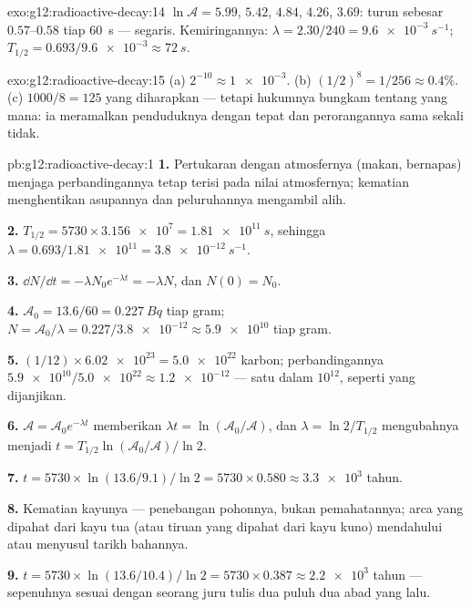\begin{solution}{exo:g12:radioactive-decay:14}
$\ln \mathcal A = 5.99$, $5.42$, $4.84$, $4.26$, $3.69$: turun sebesar
$0.57$--$0.58$ tiap \qty{60}{s} --- segaris. Kemiringannya:
$\lambda = 2.30/240 = \qty{9.6e-3}{s^{-1}}$;
$T_{1/2} = 0.693/\num{9.6e-3} \approx \qty{72}{s}$.
\end{solution}

\begin{solution}{exo:g12:radioactive-decay:15}
(a) $2^{-10} \approx \num{1e-3}$. (b) $(1/2)^8 = 1/256 \approx
0.4\%$. (c) $1000/8 = 125$ yang diharapkan --- tetapi hukumnya bungkam tentang
yang mana: ia meramalkan penduduknya dengan tepat dan perorangannya sama sekali tidak.
\end{solution}

\begin{solution}{pb:g12:radioactive-decay:1}
\textbf{1.} Pertukaran dengan atmosfernya (makan, bernapas) menjaga
perbandingannya tetap terisi pada nilai atmosfernya; kematian menghentikan
asupannya dan peluruhannya mengambil alih.

\textbf{2.} $T_{1/2} = \num{5730} \times \num{3.156e7} =
\qty{1.81e11}{s}$, sehingga $\lambda = 0.693/\num{1.81e11} =
\qty{3.8e-12}{s^{-1}}$.

\textbf{3.} $\dd N/\dd t = -\lambda N_0 e^{-\lambda t} = -\lambda N$,
dan $N(0) = N_0$.

\textbf{4.} $\mathcal A_0 = 13.6/60 = \qty{0.227}{Bq}$ tiap gram;
$N = \mathcal A_0/\lambda = 0.227/\num{3.8e-12} \approx \num{5.9e10}$
 tiap gram.

\textbf{5.} $(1/12) \times \num{6.02e23} = \num{5.0e22}$ 
karbon; perbandingannya $\num{5.9e10}/\num{5.0e22} \approx \num{1.2e-12}$
--- satu dalam $10^{12}$, seperti yang dijanjikan.

\textbf{6.} $\mathcal A = \mathcal A_0 e^{-\lambda t}$ memberikan
$\lambda t = \ln(\mathcal A_0/\mathcal A)$, dan $\lambda =
\ln 2/T_{1/2}$ mengubahnya menjadi
$t = T_{1/2}\ln(\mathcal A_0/\mathcal A)/\ln 2$.

\textbf{7.} $t = \num{5730} \times \ln(13.6/9.1)/\ln 2 =
\num{5730} \times 0.580 \approx \num{3.3e3}$ tahun.

\textbf{8.} Kematian kayunya --- penebangan pohonnya, bukan
pemahatannya; arca yang dipahat dari kayu tua (atau tiruan yang dipahat dari kayu
kuno) mendahului atau menyusul tarikh bahannya.

\textbf{9.} $t = \num{5730} \times \ln(13.6/10.4)/\ln 2 =
\num{5730} \times 0.387 \approx \num{2.2e3}$ tahun --- sepenuhnya
sesuai dengan seorang juru tulis dua puluh dua abad yang lalu.


\end{solution}
